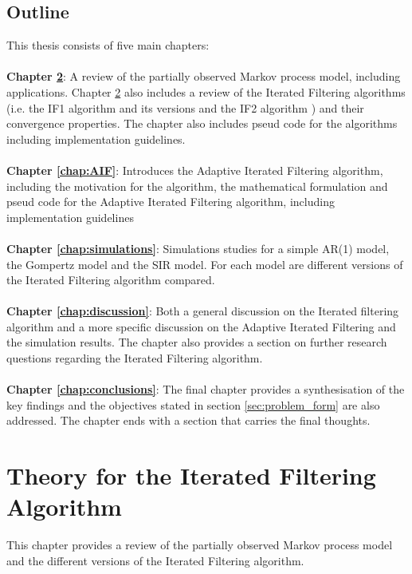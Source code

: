 \documentclass[twoside,openright]{report}
\begin{document}
\section{Outline}
This thesis consists of five main chapters:
\\\\
\textbf{Chapter \ref{chap:theory}}: A review of the partially observed Markov process model, including applications. Chapter \ref{chap:theory} also includes a review of the  Iterated Filtering algorithms (i.e. the IF1 algorithm and its versions and the IF2 algorithm ) and their convergence properties. The chapter also includes pseud code for the algorithms including implementation guidelines. 
\\\\
\textbf{Chapter \ref{chap:AIF}}: Introduces the Adaptive Iterated Filtering algorithm, including the motivation for the algorithm, the mathematical formulation and pseud code for the Adaptive Iterated Filtering algorithm, including implementation guidelines
\\\\
\textbf{Chapter \ref{chap:simulations}}: Simulations studies for a simple AR(1) model, the Gompertz model and the SIR model. For each model are different versions of the Iterated Filtering algorithm compared. 
\\\\
\textbf{Chapter \ref{chap:discussion}}: Both a general discussion on the Iterated filtering algorithm and a more specific discussion on the Adaptive Iterated Filtering and the simulation results. The chapter also provides a section on further research questions regarding the Iterated Filtering algorithm.   
\\\\
\textbf{Chapter \ref{chap:conclusions}}: The final chapter provides a synthesisation of the key findings and the objectives stated in section \ref{sec:problem_form} are also addressed. The chapter ends with a section that carries the final thoughts.  


\chapter{Theory for the Iterated Filtering Algorithm} \label{chap:theory}
This chapter provides a review of the partially observed Markov process model and the different versions of the  Iterated Filtering algorithm. 
\end{document}
